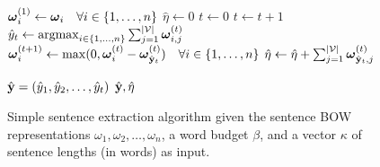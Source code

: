 
\begin{figure}
  \begin{algorithmic}[1]
   
      \State $\boldsymbol{\omega}_i^{(1)}  \gets \boldsymbol{\omega}_i \quad \forall i \in \{1, \ldots, n\}$
      \State $\hat{\eta} \gets 0$
      \State $t \gets 0$
        \State $t \gets t + 1$
        \State $\hat{y}_t \gets \operatorname{arg max}_{i \in \{1,\ldots, n\}}
            \sum_{j=1}^{|\mathcal{V}|} \boldsymbol{\omega}^{(t)}_{i,j}$
            \State $\boldsymbol{\omega}_i^{(t+1)} \gets \max(0, \boldsymbol{\omega}_i^{(t)} - \boldsymbol{\omega}^{(t)}_{\hat{\mathbf{y}}_t} )\quad  \forall i \in \{1, \ldots, n \}$
        \State $\hat{\eta} \gets \hat{\eta} + \sum_{j=1}^{|\mathcal{V}|} \boldsymbol{\omega}_{\hat{\mathbf{y}}_t,j}^{(t)}$
         

      \EndWhile
      \State $\hat{\mathbf{y}} = (\hat{y}_1, \hat{y}_2, \ldots, \hat{y}_t)$
        \State \Return $\hat{\mathbf{y}}, \hat{\eta}$ 
    \EndProcedure
  \end{algorithmic}
\caption{Simple sentence extraction algorithm given
 the sentence BOW representations $\omega_1, \omega_2, \ldots, \omega_n$, 
  a word budget $\beta$, and a vector $\kappa$ of sentence lengths (in words)
  as input.}
\label{alg:wimp_ext_alg}
\end{figure}
